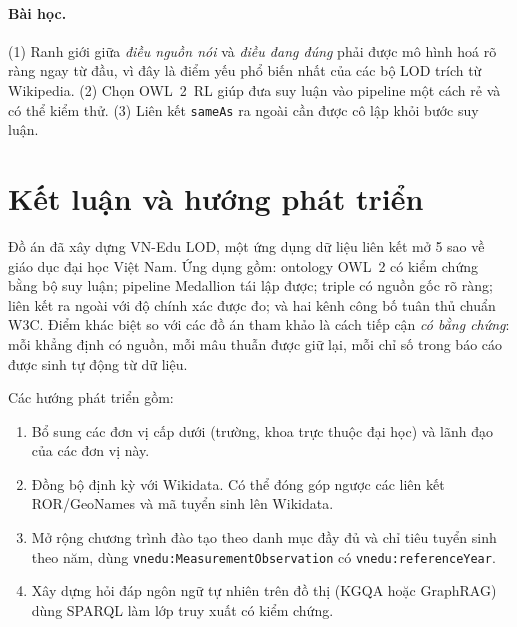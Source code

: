 \documentclass[12pt,a4paper]{article}
\newcommand{\vn}[1]{\texttt{vnedu:\allowbreak #1}}
\newcommand{\proj}{VN-Edu LOD}
\begin{document}
\paragraph{Bài học.} (1) Ranh giới giữa \emph{điều nguồn nói} và \emph{điều đang đúng} phải được mô hình hoá rõ ràng
ngay từ đầu, vì đây là điểm yếu phổ biến nhất của các bộ LOD trích từ Wikipedia. (2) Chọn OWL~2~RL giúp đưa suy luận vào
pipeline một cách rẻ và có thể kiểm thử. (3) Liên kết \texttt{sameAs} ra ngoài cần được cô lập khỏi bước suy luận.

\section{Kết luận và hướng phát triển}\label{sec:conclusion}
Đồ án đã xây dựng \proj{}, một ứng dụng dữ liệu liên kết mở 5 sao về giáo dục đại học Việt Nam. Ứng dụng gồm: ontology
OWL~2 có kiểm chứng bằng bộ suy luận; pipeline Medallion tái lập được; \metricUnionTriples{} triple có nguồn gốc rõ ràng;
\metricLinkTriples{} liên kết ra ngoài với độ chính xác được đo; và hai kênh công bố tuân thủ chuẩn W3C. Điểm khác biệt
so với các đồ án tham khảo là cách tiếp cận \emph{có bằng chứng}: mỗi khẳng định có nguồn, mỗi mâu thuẫn được giữ lại,
mỗi chỉ số trong báo cáo được sinh tự động từ dữ liệu.

Các hướng phát triển gồm:
\begin{enumerate}
  \item Bổ sung các đơn vị cấp dưới (trường, khoa trực thuộc đại học) và lãnh đạo của các đơn vị này.
  \item Đồng bộ định kỳ với Wikidata. Có thể đóng góp ngược các liên kết ROR/GeoNames và mã tuyển sinh lên Wikidata.
  \item Mở rộng chương trình đào tạo theo danh mục đầy đủ và chỉ tiêu tuyển sinh theo năm, dùng
  \vn{MeasurementObservation} có \vn{referenceYear}.
  \item Xây dựng hỏi đáp ngôn ngữ tự nhiên trên đồ thị (KGQA hoặc GraphRAG) dùng SPARQL làm lớp truy xuất có kiểm chứng.
\end{enumerate}

\clearpage
{}



\clearpage
\appendix
\end{document}
